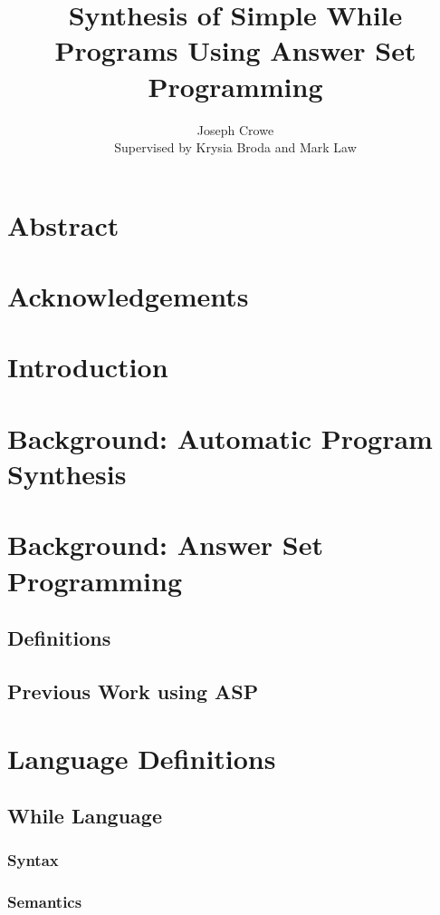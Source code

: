 \documentclass[a4paper,twoside,notitlepage]{article}
\begin{document}
\title{Synthesis of Simple While Programs Using Answer Set Programming}
\author{Joseph Crowe \\ Supervised by Krysia Broda and Mark Law}
\maketitle
\clearpage

\tableofcontents

\section{Abstract}

\section{Acknowledgements}

\section{Introduction}

\section{Background: Automatic Program Synthesis}

\section{Background: Answer Set Programming}
\subsection{Definitions}
\subsection{Previous Work using ASP}

\section{Language Definitions}
\subsection{While Language}
\subsubsection{Syntax}
\subsubsection{Semantics}
\end{document}
